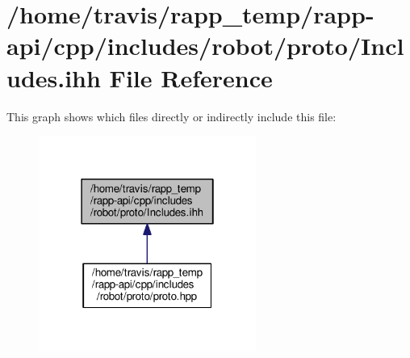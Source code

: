 \hypertarget{robot_2proto_2Includes_8ihh}{\section{/home/travis/rapp\-\_\-temp/rapp-\/api/cpp/includes/robot/proto/\-Includes.ihh File Reference}
\label{robot_2proto_2Includes_8ihh}
}
This graph shows which files directly or indirectly include this file\-:
\nopagebreak
\begin{figure}[H]
\begin{center}
\leavevmode
\includegraphics[width=202pt]{robot_2proto_2Includes_8ihh__dep__incl}
\end{center}
\end{figure}
